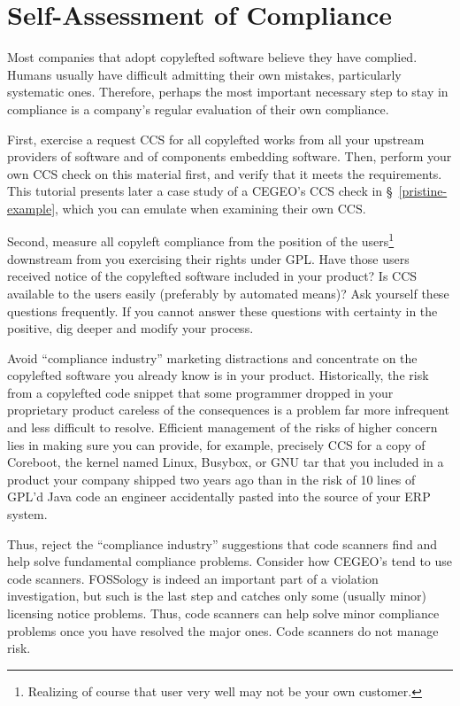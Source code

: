 \section{Self-Assessment of Compliance}

Most companies that adopt copylefted software believe they have complied.
Humans usually have difficult admitting their own mistakes, particularly
systematic ones.  Therefore, perhaps the most important necessary step to
stay in compliance is a company's regular evaluation of their own compliance.

First, exercise a request CCS for all copylefted works from all your upstream
providers of software and of components embedding software.  Then, perform
your own CCS check on this material first, and verify that it meets the
requirements.  This tutorial presents later a case study of a CEGEO's CCS
check in \S~\ref{pristine-example}, which you can emulate when examining
their own CCS\@.

Second, measure all copyleft compliance from the position of the
users\footnote{Realizing of course that user very well may not be your own
  customer.} downstream from you exercising their rights under GPL\@.  Have
those users received notice of the copylefted software included in your
product?  Is CCS available to the users easily (preferably by automated
means)?  Ask yourself these questions frequently.  If you cannot answer these
questions with certainty in the positive, dig deeper and modify your process.

Avoid ``compliance industry'' marketing distractions and concentrate on the
copylefted software you already know is in your product.  Historically, the
risk from a copylefted code snippet that some programmer dropped in your
proprietary product careless of the consequences is a problem far more
infrequent and less difficult to resolve.  Efficient management of the risks
of higher concern lies in making sure you can provide, for example, precisely
CCS for a copy of Coreboot, the kernel named Linux, Busybox, or GNU tar that
you included in a product your company shipped two years ago than in the risk
of 10 lines of GPL'd Java code an engineer accidentally pasted into the
source of your ERP system.

Thus, reject the ``compliance industry'' suggestions that code scanners find
and help solve fundamental compliance problems.  Consider how CEGEO's tend to
use code scanners.  FOSSology is indeed an important part of a violation
investigation, but such is the last step and catches only some (usually
minor) licensing notice problems.  Thus, code scanners can help solve minor
compliance problems once you have resolved the major ones.  Code scanners
do not manage risk.

